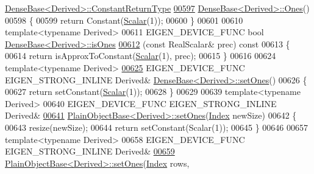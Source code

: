 \begin{DoxyCode}
      \hyperlink{group___core___module_class_eigen_1_1_cwise_nullary_op}{DenseBase<Derived>::ConstantReturnType}
\hyperlink{group___core___module_a1284a38971d817c33e40c226f6347e37}{00597} \hyperlink{group___core___module_a1284a38971d817c33e40c226f6347e37}{DenseBase<Derived>::Ones}()
00598 \{
00599   \textcolor{keywordflow}{return} Constant(\hyperlink{group___core___module_a5feed465b3a8e60c47e73ecce83e39a2}{Scalar}(1));
00600 \}
00601 
00610 \textcolor{keyword}{template}<\textcolor{keyword}{typename} Derived>
00611 EIGEN\_DEVICE\_FUNC \textcolor{keywordtype}{bool} \hyperlink{group___core___module_a91fb1c80e1fd4970a16fd509764225d7}{DenseBase<Derived>::isOnes}
\hyperlink{group___core___module_a91fb1c80e1fd4970a16fd509764225d7}{00612} (\textcolor{keyword}{const} RealScalar& prec) \textcolor{keyword}{const}
00613 \{
00614   \textcolor{keywordflow}{return} isApproxToConstant(\hyperlink{group___core___module_a5feed465b3a8e60c47e73ecce83e39a2}{Scalar}(1), prec);
00615 \}
00616 
00624 \textcolor{keyword}{template}<\textcolor{keyword}{typename} Derived>
\hyperlink{group___core___module_ad18970fd7d9f9c3d8db9d05fa8652a25}{00625} EIGEN\_DEVICE\_FUNC EIGEN\_STRONG\_INLINE Derived& \hyperlink{group___core___module_ad18970fd7d9f9c3d8db9d05fa8652a25}{DenseBase<Derived>::setOnes}()
00626 \{
00627   \textcolor{keywordflow}{return} setConstant(\hyperlink{group___core___module_a5feed465b3a8e60c47e73ecce83e39a2}{Scalar}(1));
00628 \}
00629 
00639 \textcolor{keyword}{template}<\textcolor{keyword}{typename} Derived>
00640 EIGEN\_DEVICE\_FUNC EIGEN\_STRONG\_INLINE Derived&
\hyperlink{class_eigen_1_1_plain_object_base_a2871e88e1feb1cc665fa1f1cc800078b}{00641} \hyperlink{class_eigen_1_1_plain_object_base_a2871e88e1feb1cc665fa1f1cc800078b}{PlainObjectBase<Derived>::setOnes}(\hyperlink{namespace_eigen_a62e77e0933482dafde8fe197d9a2cfde}{Index} newSize)
00642 \{
00643   resize(newSize);
00644   \textcolor{keywordflow}{return} setConstant(Scalar(1));
00645 \}
00646 
00657 \textcolor{keyword}{template}<\textcolor{keyword}{typename} Derived>
00658 EIGEN\_DEVICE\_FUNC EIGEN\_STRONG\_INLINE Derived&
\hyperlink{class_eigen_1_1_plain_object_base_a8e3043e7a51c524c1d1793a3e9826819}{00659} \hyperlink{class_eigen_1_1_plain_object_base_a2871e88e1feb1cc665fa1f1cc800078b}{PlainObjectBase<Derived>::setOnes}(\hyperlink{namespace_eigen_a62e77e0933482dafde8fe197d9a2cfde}{Index} rows, 

\end{DoxyCode}
